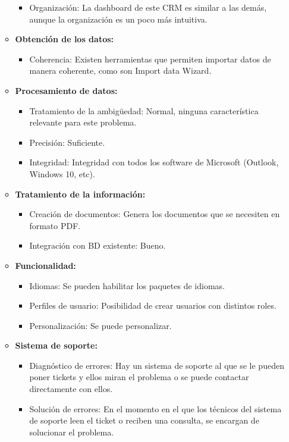\documentclass{article}
\begin{document}
\begin{itemize}
\begin{itemize}
\begin{center}
\end{center}
\begin{itemize}
\item Organización: La dashboard de este CRM es similar a las demás, aunque la organización es un poco más intuitiva. 
\end{itemize}
\item \textbf{Obtención de los datos:}
\begin{itemize}
\item Coherencia: Existen herramientas que permiten importar datos de manera coherente, como son Import data Wizard. 
\end{itemize}
\item \textbf{Procesamiento de datos:}
\begin{itemize}
\item Tratamiento de la ambigüedad: Normal, ninguna característica relevante para este problema. 
\item Precisión: Suficiente. 
\item Integridad: Integridad con todos los software de Microsoft (Outlook, Windows 10, etc).
\end{itemize}
\item \textbf{Tratamiento de la información:}
\begin{itemize}
\item Creación de documentos: Genera los documentos que se necesiten en formato PDF. 
\item Integración con BD existente: Bueno.
\end{itemize}
\item \textbf{Funcionalidad:}
\begin{itemize}
\item Idiomas: Se pueden habilitar los paquetes de idiomas. 
\item Perfiles de usuario: Posibilidad de crear usuarios con distintos roles. 
\item Personalización: Se puede personalizar. 
\end{itemize}
\item \textbf{Sistema de soporte:}
\begin{itemize}
\item Diagnóstico de errores: Hay un sistema de soporte al que se le pueden poner tickets y ellos miran el problema o se puede contactar directamente con ellos. 
\item Solución de errores: En el momento en el que los técnicos del sistema de soporte leen el ticket o reciben una consulta, se encargan de solucionar el problema.          

\end{itemize}
\end{itemize}
\end{itemize}
\end{document}
